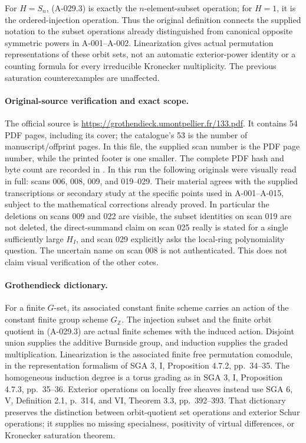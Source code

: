 For \(H=S_n\), (A-029.3) is exactly the \(n\)-element-subset
operation; for \(H=1\), it is the ordered-injection operation.
Thus the original definition connects the supplied notation to the
subset operations already distinguished from canonical opposite
symmetric powers in A-001--A-002. Linearization gives actual
permutation representations of these orbit sets, not an automatic
exterior-power identity or a counting formula for every irreducible
Kronecker multiplicity. The previous saturation counterexamples
are unaffected.

\paragraph{Original-source verification and exact scope.}
The official source is
\url{https://grothendieck.umontpellier.fr/133.pdf}. It contains
54 PDF pages, including its cover; the catalogue's 53 is the number
of manuscript/offprint pages. In this file, the supplied scan number
is the PDF page number, while the printed footer is one smaller.
The complete PDF hash and byte count are recorded in
.
In this run the following originals were visually read in full:
scans 006, 008, 009, and 019--029. Their material agrees with the
supplied transcriptions or secondary study at the specific points
used in A-001--A-015, subject to the mathematical corrections already
proved. In particular the deletions on scans 009 and 022 are visible,
the subset identities on scan 019 are not deleted, the direct-summand
claim on scan 025 really is stated for a single sufficiently large
\(H_I\), and scan 029 explicitly asks the local-ring polynomiality
question. The uncertain name on scan 008 is not authenticated.
This does not claim visual verification of the other cotes.

\paragraph{Grothendieck dictionary.}
For a finite \(G\)-set, its associated constant finite scheme carries
an action of the constant finite group scheme \(G_{\mathbb Z}\).
The injection subset and the finite orbit quotient in (A-029.3)
are actual finite schemes with the induced action. Disjoint union
supplies the additive Burnside group, and induction supplies the
graded multiplication. Linearization is the associated finite free
permutation comodule, in the representation formalism of SGA 3, I,
Proposition 4.7.2, pp.~34--35. The homogeneous induction degree
is a torus grading as in SGA 3, I, Proposition 4.7.3, pp.~35--36.
Exterior operations on locally free sheaves instead use SGA 6, V,
Definition 2.1, p.~314, and VI, Theorem 3.3, pp.~392--393.
That dictionary preserves the distinction between orbit-quotient
set operations and exterior Schur operations; it supplies no
missing specialness, positivity of virtual differences, or
Kronecker saturation theorem.
